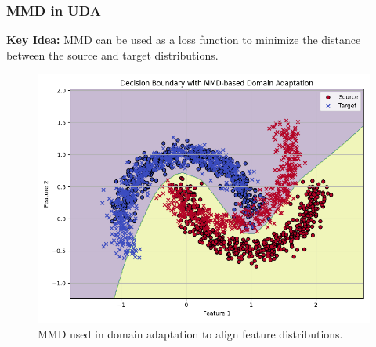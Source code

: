 \documentclass{beamer}
\begin{document}
\begin{frame}
    \frametitle{MMD in UDA}
    \textbf{Key Idea:} MMD can be used as a loss function to minimize the distance between the source and target distributions.\\

    \begin{figure}[h]
        \centering
        \includegraphics[width=0.8\linewidth]{mmd_adaptation.png}
        \caption{MMD used in domain adaptation to align feature distributions.}
    \end{figure}

\end{frame}





\end{document}
